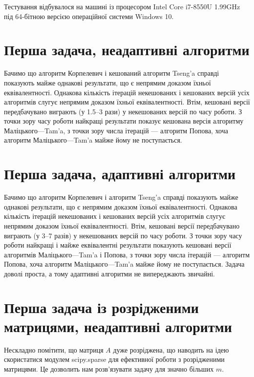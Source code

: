 Тестування відбувалося на машині із процесором Intel Core i7-8550U 1.99GHz під 64-бітною версією операційної системи Windows 10.

\section{Перша задача, неадаптивні алгоритми}



Бачимо що алгоритм Корпелевич і кешований алгоритм Tseng'a справді показують майже однакові результати, що є непрямим доказом їхньої еквівалентності. Однакова кількість ітерацій некешованих і кешованих версій усіх алгоритмів слугує непрямим доказом їхньої еквівалентності. Втім, кешовані версії передбачувано виграють (у 1.5--3 рази) у некешованих версій по часу роботи. З точки зору часу роботи найкращі результати показує кешована версія алгоритму Маліцького---Tam'a, з точки зору числа ітерацій --- алгоритм Попова, хоча алгоритм Маліцького---Tam'a майже йому не поступається.

\section{Перша задача, адаптивні алгоритми}



Бачимо що алгоритм Корпелевич і алгоритм Tseng'a справді показують майже однакові результати, що є непрямим доказом їхньої еквівалентності. Однакова кількість ітерацій некешованих і кешованих версій усіх алгоритмів слугує непрямим доказом їхньої еквівалентності. Втім, кешовані версії передбачувано виграють (у 3--7 разів) у некешованих версій по часу роботи. З точки зору часу роботи найкращі і майже еквівалентні результати показують кешовані версії алгоритмів Маліцького---Tam'a і Попова, з точки зору числа ітерацій --- алгоритм Попова, хоча алгоритм Маліцького---Tam'a майже йому не поступається. Задача доволі проста, а тому адаптивні алгоритми не випереджають звичайні.

\section{Перша задача із розрідженими матрицями, неадаптивні алгоритми}

Нескладно помітити, що матриця $A$ дуже розріджена, що наводить на ідею скористатися модулем scipy.sparse для ефективної роботи з розрідженими матрицями. Це дозволить нам розв'язувати задачу для значно більших $m$.

